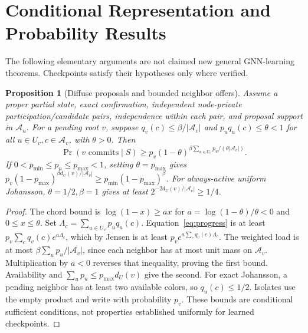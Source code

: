 \documentclass[10pt]{article}
\newtheorem{proposition}{Proposition}
\newcommand{\A}{\mathcal A}
\begin{document}
\section{Conditional Representation and Probability Results}\label{app:math}
The following elementary arguments are not claimed new general GNN-learning
theorems. Checkpoints satisfy their hypotheses only where verified.
\begin{proposition}[Diffuse proposals and bounded neighbor offers]\label{prop:diffuse}
Assume a proper partial state, exact confirmation, independent node-private
participation/candidate pairs, independence within each pair, and proposal
support in $\A_u$. For a pending root $v$, suppose
$q_v(c)\le\beta/|\A_v|$ and $p_uq_u(c)\le\theta<1$ for all
$u\in U_v,c\in\A_v$, with $\theta>0$. Then
\[
\Pr(v\text{ commits}\mid S)\ge
p_v(1-\theta)^{\beta\sum_{u\in U_v}p_u/(\theta|\A_v|)}.
\]
If $0<p_{\min}\le p_u\le p_{\max}<1$, setting $\theta=p_{\max}$ gives
$p_v(1-p_{\max})^{\beta d_U(v)/|\A_v|}
\ge p_{\min}(1-p_{\max})^\beta$.
For always-active uniform Johansson, $\theta=1/2,\beta=1$ gives at least
$2^{-2d_U(v)/|\A_v|}\ge1/4$.
\end{proposition}
\begin{proof}
The chord bound is $\log(1-x)\ge ax$ for
$a=\log(1-\theta)/\theta<0$ and $0\le x\le\theta$.
Set $\Lambda_c=\sum_{u\in U_v}p_uq_u(c)$. Equation~\eqref{eq:progress}
is at least $p_v\sum_cq_v(c)e^{a\Lambda_c}$, which by Jensen is at least
$p_ve^{a\sum_cq_v(c)\Lambda_c}$. The weighted load is at most
$\beta\sum_up_u/|\A_v|$, since each neighbor has at most unit mass on
$\A_v$. Multiplication by $a<0$ reverses that inequality, proving the first
bound. Availability and $\sum_up_u\le p_{\max}d_U(v)$ give the second.
For exact Johansson, a pending neighbor has at least two available colors,
so $q_u(c)\le1/2$. Isolates use the empty product and write with probability
$p_v$. These bounds are conditional sufficient conditions, not properties
established uniformly for learned checkpoints.
\end{proof}
\end{document}
